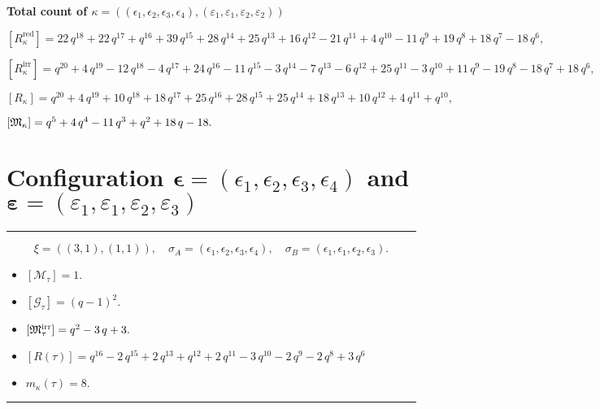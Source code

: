 \documentclass[10pt,a4paper]{amsart}
\begin{document}
\noindent\textbf{Total count of $\kappa = ((\epsilon_1,\epsilon_2,\epsilon_3,\epsilon_4), (\varepsilon_1,\varepsilon_1,\varepsilon_2,\varepsilon_2))$}\medskip

${[R_{\kappa}^{\textrm{red}}]} = 22 \, q^{18} + 22 \, q^{17} + q^{16} + 39 \, q^{15} + 28 \, q^{14} + 25 \, q^{13} + 16 \, q^{12} - 21 \, q^{11} + 4 \, q^{10} - 11 \, q^{9} + 19 \, q^{8} + 18 \, q^{7} - 18 \, q^{6} ,$

${[R_{\kappa}^{\textrm{irr}}]} = q^{20} + 4 \, q^{19} - 12 \, q^{18} - 4 \, q^{17} + 24 \, q^{16} - 11 \, q^{15} - 3 \, q^{14} - 7 \, q^{13} - 6 \, q^{12} + 25 \, q^{11} - 3 \, q^{10} + 11 \, q^{9} - 19 \, q^{8} - 18 \, q^{7} + 18 \, q^{6} ,$

${[R_{\kappa}]} = q^{20} + 4 \, q^{19} + 10 \, q^{18} + 18 \, q^{17} + 25 \, q^{16} + 28 \, q^{15} + 25 \, q^{14} + 18 \, q^{13} + 10 \, q^{12} + 4 \, q^{11} + q^{10} ,$

${[{\frak M}_{\kappa}]} = q^{5} + 4 \, q^{4} - 11 \, q^{3} + q^{2} + 18 \, q - 18 .$

\newpage{}

\section{Configuration $\bm{\epsilon} = (\epsilon_1,\epsilon_2,\epsilon_3,\epsilon_4)$ and $\bm{\varepsilon} =(\varepsilon_1,\varepsilon_1,\varepsilon_2,\varepsilon_3)$}
\noindent\rule{8cm}{0.4pt}

$$\xi = ({(3, 1), (1, 1)}),\quad \sigma_A = ({{\epsilon_1, \epsilon_2, \epsilon_3}, {\epsilon_4}}),\quad \sigma_B = ({{\epsilon_1, \epsilon_1, \epsilon_2}, {\epsilon_3}}).$$

\begin{itemize}
 \item $[\mathcal{M}_{\tau}] = 1 .$

 \item $[\mathcal{G}_{\tau}] = {\left(q - 1\right)}^{2} .$

 \item $[{\frak M}_{\tau}^{\textrm{irr}}] = q^{2} - 3 \, q + 3 .$

 \item $[R(\tau)] = q^{16} - 2 \, q^{15} + 2 \, q^{13} + q^{12} + 2 \, q^{11} - 3 \, q^{10} - 2 \, q^{9} - 2 \, q^{8} + 3 \, q^{6} $

 \item $m_{\kappa}(\tau) = 8 .$

 \end{itemize}
\noindent\rule{8cm}{0.4pt}
\end{document}
